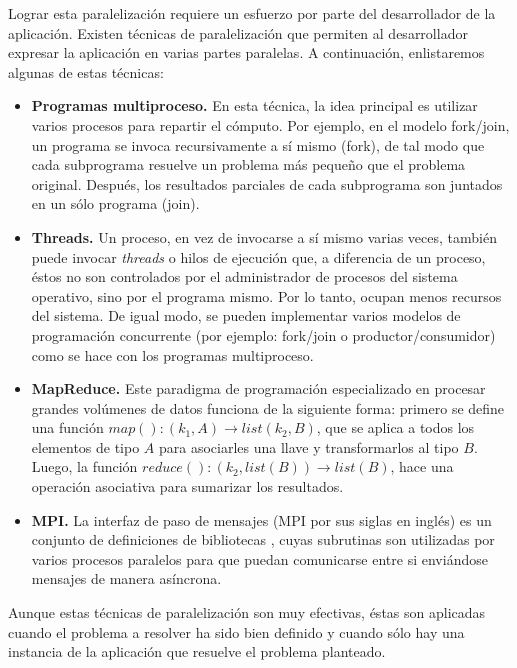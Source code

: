 Lograr esta paralelización requiere un esfuerzo por parte del desarrollador de la aplicación. Existen técnicas de paralelización que permiten al desarrollador expresar la aplicación en varias partes paralelas. A continuación, enlistaremos algunas de estas técnicas:

\begin{itemize}
\item{\textbf{Programas multiproceso.} En esta técnica, la idea principal es utilizar varios procesos para repartir el cómputo. Por ejemplo, en el modelo fork/join, un programa se invoca recursivamente a sí mismo (fork), de tal modo que cada subprograma resuelve un problema más pequeño que el problema original. Después, los resultados parciales de cada subprograma son juntados en un sólo programa (join).}

\item{\textbf{Threads.} Un proceso, en vez de invocarse a sí mismo varias veces, también puede invocar \emph{threads} o hilos de ejecución que, a diferencia de un proceso, éstos no son controlados por el administrador de procesos del sistema operativo, sino por el programa mismo. Por lo tanto, ocupan menos recursos del sistema. De igual modo, se pueden implementar varios modelos de programación concurrente (por ejemplo: fork/join o productor/consumidor) como se hace con los programas multiproceso.}

\item{\textbf{MapReduce.} Este paradigma de programación especializado en procesar grandes volúmenes de datos \cite{dean2008mapreduce} funciona de la siguiente forma: primero se define una función $map(): (k_1,A) \rightarrow list(k_2,B)$, que se aplica a todos los elementos de tipo $A$ para asociarles una llave y transformarlos al tipo $B$. Luego, la función $reduce(): (k_2, list(B)) \rightarrow list(B)$, hace una operación asociativa para sumarizar los resultados.}

\item{\textbf{MPI.} La interfaz de paso de mensajes (MPI por sus siglas en inglés) es un conjunto de definiciones de bibliotecas \cite{lusk2009mpi}, cuyas subrutinas son utilizadas por varios procesos paralelos para que puedan comunicarse entre si enviándose mensajes de manera asíncrona.}
\end{itemize}

Aunque estas técnicas de paralelización son muy efectivas, éstas son aplicadas cuando el problema a resolver ha sido bien definido y cuando sólo hay una instancia de la aplicación que resuelve el problema planteado. 

